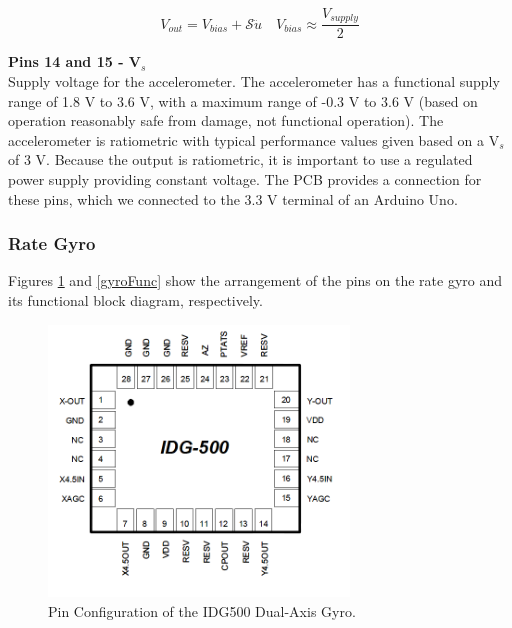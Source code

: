 \documentclass{article}
\theoremstyle{plain}
\theoremstyle{definition}
\theoremstyle{remark}
\newcommand{\Sens}{\mathcal{S}}
\begin{document}
\begin{equation}
V_{out} = V_{bias} + \Sens \ddot{u} \quad V_{bias} \approx \frac{V_{supply}}{2}
\label{Accel_EQ}
\end{equation}


\textbf{Pins 14 and 15 - V$_s$}\\
Supply voltage for the accelerometer. The accelerometer has a functional supply range of 1.8 V to 3.6 V, with a maximum range of -0.3 V to 3.6 V (based on operation reasonably safe from damage, not functional operation). The accelerometer is ratiometric with typical performance values given based on a V$_s$ of 3 V. Because the output is ratiometric, it is important to use a regulated power supply providing constant voltage. The PCB provides a connection for these pins, which we connected to the 3.3 V terminal of an Arduino Uno.\\ 

\subsubsection{Rate Gyro}
Figures \ref{gyroPins} and \ref{gyroFunc} show the arrangement of the pins on the rate gyro and its functional block diagram, respectively. \\

\begin{figure}[hbt]
\begin{center}
\includegraphics[width = 8cm]{IDG500Pins.png}
\caption{Pin Configuration of the IDG500 Dual-Axis Gyro.}
\label{gyroPins}
\end{center}
\end{figure}
\end{document}
